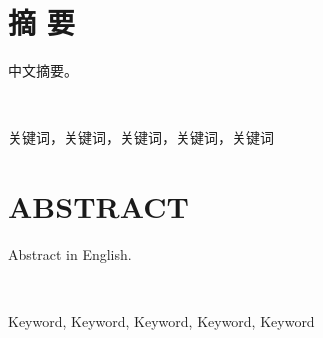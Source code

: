 \chapter*{\hspace{-0.5cm}\songti{}\textbf{摘 \qquad 要}}
\thispagestyle{noheader}

中文摘要。

\

 关键词，关键词，关键词，关键词，关键词

\chapter*{\songti{}\textbf{ABSTRACT}}
\thispagestyle{noheader}

Abstract in English.

\

 Keyword, Keyword, Keyword, Keyword, Keyword
